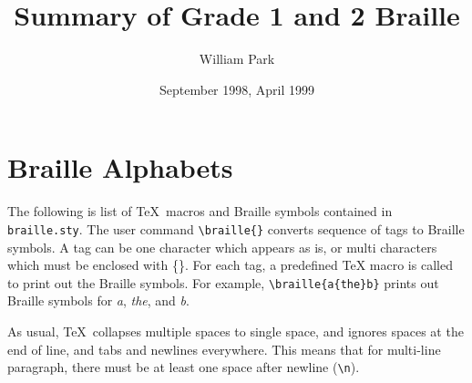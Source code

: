 \documentclass[draft]{article}
\begin{document}
\title{Summary of Grade 1 and 2 Braille}
\author{William Park}
\date{September 1998, April 1999}
\maketitle


\section{Braille Alphabets}

The following is list of \TeX\ macros and Braille symbols contained in
{\tt braille.sty}.  The user command \verb+\braille{}+ converts
sequence of tags to Braille symbols.  A tag can be one character which
appears as is, or multi characters which must be enclosed with \{\}.
For each tag, a predefined TeX macro is called to print out the
Braille symbols.  For example, \verb+\braille{a{the}b}+ prints out
Braille symbols for {\em a}, {\em the}, and {\em b}.

As usual, \TeX\ collapses multiple spaces to single space, and ignores
spaces at the end of line, and tabs and newlines everywhere.  This means
that for multi-line paragraph, there must be at least one space after
newline (\verb+\n+).
\end{document}
